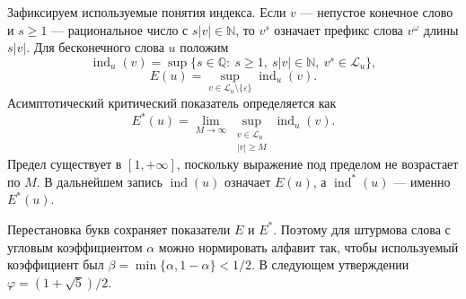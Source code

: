 Зафиксируем используемые понятия индекса. Если $v$ --- непустое
конечное слово и $s\ge1$ --- рациональное число с $s|v|\in\mathbb N$,
то $v^s$ означает префикс слова $v^\omega$ длины $s|v|$.
Для бесконечного слова $u$ положим
\[
 \operatorname{ind}_u(v)
 =\sup\{s\in\mathbb Q:\ s\ge1,\ s|v|\in\mathbb N,\ v^s\in\mathcal L_u\},
 \]
 \[
 E(u)=\sup_{v\in\mathcal L_u\setminus\{\varepsilon\}}\operatorname{ind}_u(v).
\]
Асимптотический критический показатель определяется как
\[
 E^*(u)=\lim_{M\to\infty}
 \sup_{\substack{v\in\mathcal L_u\\ |v|\ge M}}\operatorname{ind}_u(v).
\]
Предел существует в $[1,+\infty]$, поскольку выражение под
пределом не возрастает по $M$. В дальнейшем запись
$\operatorname{ind}(u)$ означает $E(u)$, а
$\operatorname{ind}^*(u)$ --- именно $E^*(u)$.

Перестановка букв сохраняет показатели $E$ и $E^*$.
Поэтому для штурмова слова с угловым коэффициентом $\alpha$
можно нормировать алфавит так, чтобы используемый коэффициент
был $\beta=\min\{\alpha,1-\alpha\}<1/2$.
В следующем утверждении $\varphi=(1+\sqrt5)/2$.

